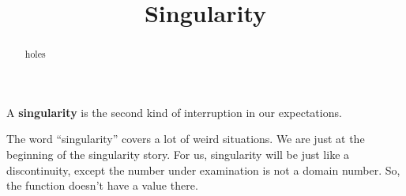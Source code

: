 \documentclass{ximera}
\title{Singularity}
\begin{document}
\begin{abstract}
holes
\end{abstract}
\maketitle











A \textbf{singularity} is the second kind of interruption in our expectations. 



The word ``singularity'' covers a lot of weird situations.  We are just at the beginning of the singularity story.  For us, singularity will be just like a discontinuity, except the number under examination is not a domain number.  So, the function doesn't have a value there.
\end{document}
